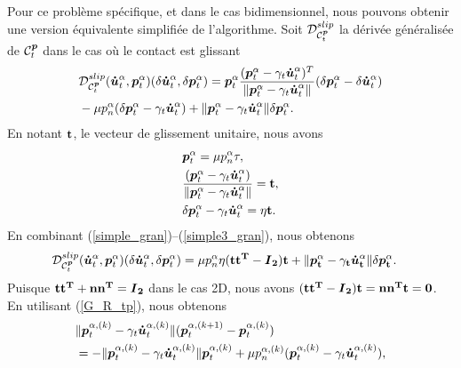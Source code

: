 \noindent Pour ce problème spécifique, et dans le cas bidimensionnel, nous pouvons obtenir une version équivalente simplifiée de l'algorithme. Soit ${\cal D}_{{\cal C}_{t}^{\boldsymbol{p}}}^{slip}$ la dérivée généralisée de ${\cal C}_{t}^{\boldsymbol{p}}$ dans le cas où le contact est glissant
\begin{align}\label{simple_gran}
&{\cal D}_{{\cal C}_{t}^{\boldsymbol{p}}}^{slip}(\boldsymbol{\dot{u}}^{\alpha}_t,\boldsymbol{p}^{\alpha}_t)(\delta\boldsymbol{\dot{u}}^{\alpha}_t,\delta\boldsymbol{p}^{\alpha}_t)=  \boldsymbol{p}^{\alpha}_t\frac{(\boldsymbol{p}^{\alpha}_t - \gamma_t \boldsymbol{\dot{u}}^{\alpha}_t)^T}{\|\boldsymbol{p}^{\alpha}_t - \gamma_t \boldsymbol{\dot{u}}^{\alpha}_t\|}(\delta\boldsymbol{p}^{\alpha}_t - \delta\boldsymbol{\dot{u}}^{\alpha}_t)\\
& - \mu p^{\alpha}_n (\delta\boldsymbol{p}^{\alpha}_t - \gamma_t \boldsymbol{\dot{u}}^{\alpha}_t)+\|\boldsymbol{p}^{\alpha}_t - \gamma_t \boldsymbol{\dot{u}}^{\alpha}_t\|\delta\boldsymbol{p}^{\alpha}_t\nonumber.
\end{align}
En notant $\bf{t}$, le vecteur de glissement unitaire, nous avons
\begin{align}
&\boldsymbol{p}^{\alpha}_t=\mu p^{\alpha}_n\tau,\label{simple1_gran}\\
&\frac{(\boldsymbol{p}^{\alpha}_t - \gamma_t \boldsymbol{\dot{u}}^{\alpha}_t)}{\|\boldsymbol{p}^{\alpha}_t - \gamma_t \boldsymbol{\dot{u}}^{\alpha}_t\|}=\bf{t},\label{simple2_gran}\\
&\delta\boldsymbol{p}^{\alpha}_t - \gamma_t \boldsymbol{\dot{u}}^{\alpha}_t=\eta \bf{t}.\label{simple3_gran}
\end{align}
En combinant (\ref{simple_gran})--(\ref{simple3_gran}), nous obtenons
\begin{align}
&{\cal D}_{{\cal C}_{t}^{\boldsymbol{p}}}^{slip}(\boldsymbol{\dot{u}}^{\alpha}_t,\boldsymbol{p}^{\alpha}_t)(\delta\boldsymbol{\dot{u}}^{\alpha}_t,\delta\boldsymbol{p}^{\alpha}_t)=  \mu p^{\alpha}_n\eta(\bf{t}\bf{t}^T- \mbox{\boldmath{$I$}}_2)\bf{t}+\|\boldsymbol{p}^{\alpha}_t - \gamma_t \boldsymbol{\dot{u}}^{\alpha}_t\|\delta\boldsymbol{p}^{\alpha}_t.
\end{align}
Puisque  $\bf{t}\bf{t}^T+\bf{n}\bf{n}^T = \mbox{\boldmath{$I$}}_2 $ dans le cas 2D, nous avons $(\bf{t}\bf{t}^T- \mbox{\boldmath{$I$}}_2)\bf{t} = \bf{n}\bf{n}^T \bf{t} = \bf{0}$. 
En utilisant (\ref{G_R_tp}), nous obtenons
\begin{align}
&\|\boldsymbol{p}^{\alpha,(k)}_t - \gamma_t \boldsymbol{\dot{u}}^{\alpha,(k)}_t\|(\boldsymbol{p}^{\alpha,(k+1)}_t - \boldsymbol{p}^{\alpha,(k)}_t)\label{G_R_tp_eq}\\
&= - \|\boldsymbol{p}^{\alpha,(k)}_t - \gamma_t \boldsymbol{\dot{u}}^{\alpha,(k)}_t\|\boldsymbol{p}^{\alpha,(k)}_t + \mu p^{\alpha,(k)}_n (\boldsymbol{p}^{\alpha,(k)}_t - \gamma_t \boldsymbol{\dot{u}}^{\alpha,(k)}_t),\nonumber
\end{align}
